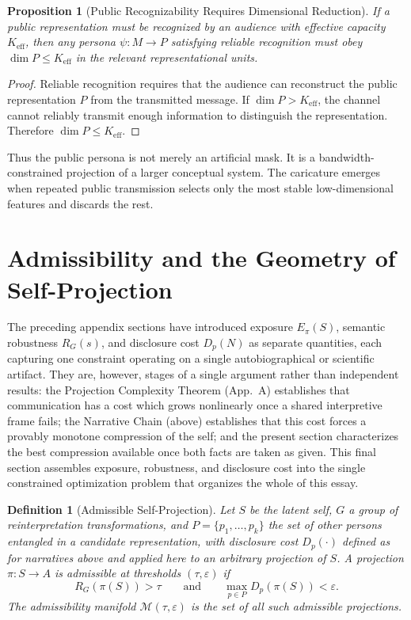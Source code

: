 \documentclass[11pt]{article}
\theoremstyle{plain}
\newtheorem{definition}{Definition}[section]
\newtheorem{proposition}{Proposition}[section]
\begin{document}
\begin{proposition}[Public Recognizability Requires Dimensional Reduction]
If a public representation must be recognized by an audience with effective capacity $K_{\mathrm{eff}}$, then any persona $\psi : M \to P$ satisfying reliable recognition must obey $\dim P \leq K_{\mathrm{eff}}$ in the relevant representational units.
\end{proposition}
\begin{proof}
Reliable recognition requires that the audience can reconstruct the public representation $P$ from the transmitted message. If $\dim P > K_{\mathrm{eff}}$, the channel cannot reliably transmit enough information to distinguish the representation. Therefore $\dim P \leq K_{\mathrm{eff}}$.
\end{proof}

Thus the public persona is not merely an artificial mask. It is a bandwidth-constrained projection of a larger conceptual system. The caricature emerges when repeated public transmission selects only the most stable low-dimensional features and discards the rest.

\section{Admissibility and the Geometry of Self-Projection}

The preceding appendix sections have introduced exposure $E_\pi(S)$, semantic robustness $R_G(s)$, and disclosure cost $D_p(N)$ as separate quantities, each capturing one constraint operating on a single autobiographical or scientific artifact. They are, however, stages of a single argument rather than independent results: the Projection Complexity Theorem (App.~A) establishes that communication has a cost which grows nonlinearly once a shared interpretive frame fails; the Narrative Chain (above) establishes that this cost forces a provably monotone compression of the self; and the present section characterizes the best compression available once both facts are taken as given. This final section assembles exposure, robustness, and disclosure cost into the single constrained optimization problem that organizes the whole of this essay.

\begin{definition}[Admissible Self-Projection]
Let $S$ be the latent self, $G$ a group of reinterpretation transformations, and $P = \{p_1,\ldots,p_k\}$ the set of other persons entangled in a candidate representation, with disclosure cost $D_p(\cdot)$ defined as for narratives above and applied here to an arbitrary projection of $S$. A projection $\pi : S \to A$ is \emph{admissible} at thresholds $(\tau,\varepsilon)$ if
\[
R_G(\pi(S)) > \tau \qquad \text{and} \qquad \max_{p \in P} D_p(\pi(S)) < \varepsilon.
\]
The admissibility manifold $\mathcal{M}(\tau,\varepsilon)$ is the set of all such admissible projections.
\end{definition}
\end{document}
